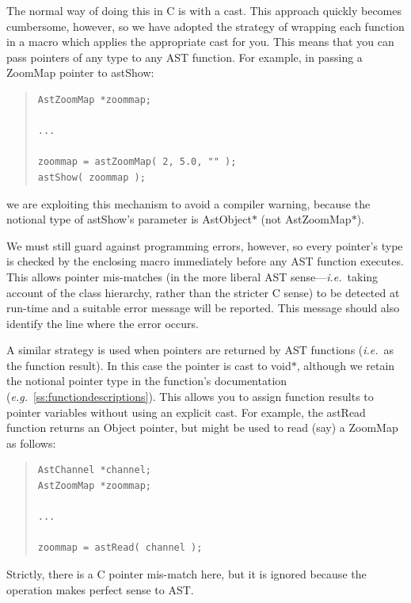 \documentclass[twoside,11pt]{article}
\newcommand{\htmlref}[2]{#1}
\newcommand{\appref}[1]{Appendix~\ref{#1}}
\renewcommand{\appref}[1]{\ref{#1}}
\begin{document}
The normal way of doing this in C is with a cast. This approach
quickly becomes cumbersome, however, so we have adopted the strategy
of wrapping each function in a macro which applies the appropriate
cast for you. This means that you can pass pointers of any type to any
AST function. For example, in passing a \htmlref{ZoomMap}{ZoomMap} pointer to \htmlref{astShow}{astShow}:

\begin{quote}
\small
\begin{verbatim}
AstZoomMap *zoommap;

...

zoommap = astZoomMap( 2, 5.0, "" );
astShow( zoommap );
\end{verbatim}
\normalsize
\end{quote}

we are exploiting this mechanism to avoid a compiler warning, because
the notional type of astShow's parameter is AstObject$*$ (not
AstZoomMap$*$).

We must still guard against programming errors, however, so every
pointer's type is checked by the enclosing macro immediately before
any AST function executes. This allows pointer mis-matches (in the
more liberal AST sense---{\em{i.e.}}\ taking account of the class
hierarchy, rather than the stricter C sense) to be detected at
run-time and a suitable error message will be reported. This message
should also identify the line where the error occurs.

A similar strategy is used when pointers are returned by AST functions
({\em{i.e.}}\ as the function result). In this case the pointer is
cast to void$*$, although we retain the notional pointer type in the
function's documentation
({\em{e.g.}}\ \appref{ss:functiondescriptions}). This allows you to
assign function results to pointer variables without using an explicit
cast. For example, the \htmlref{astRead}{astRead} function returns an Object pointer, but
might be used to read (say) a ZoomMap as follows:

\begin{quote}
\small
\begin{verbatim}
AstChannel *channel;
AstZoomMap *zoommap;

...

zoommap = astRead( channel );
\end{verbatim}
\normalsize
\end{quote}

Strictly, there is a C pointer mis-match here, but it is ignored
because the operation makes perfect sense to AST.
\end{document}
